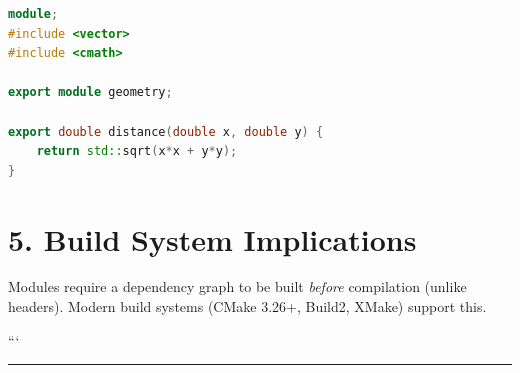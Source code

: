 \begin{lstlisting}[language={C++}]
module;
#include <vector> 
#include <cmath>

export module geometry;

export double distance(double x, double y) {
    return std::sqrt(x*x + y*y);
}
\end{lstlisting}

\hypertarget{build-system-implications}{%
\section{5. Build System Implications}\label{build-system-implications}}

Modules require a dependency graph to be built \emph{before} compilation
(unlike headers). Modern build systems (CMake 3.26+, Build2, XMake)
support this.

```

\begin{center}\rule{0.5\linewidth}{0.5pt}\end{center}
